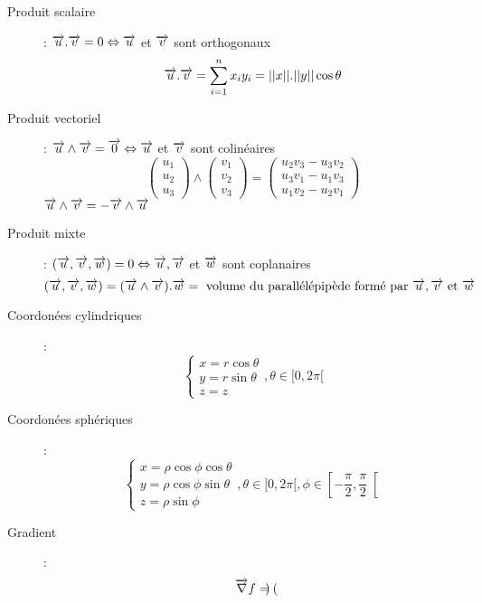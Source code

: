 \begin{description}
\item[Produit scalaire] : $\overrightarrow{u}.\overrightarrow{v}=0\Leftrightarrow\overrightarrow{u}$ et $\overrightarrow{v}$ sont orthogonaux
    \[
        \overrightarrow{u}.\overrightarrow{v}=\sum_{i=1}^nx_iy_i=||x||.||y||\cos\theta
    \]
\item[Produit vectoriel] : $\overrightarrow{u}\land\overrightarrow{v}=\overrightarrow{0}\Leftrightarrow\overrightarrow{u}$ et $\overrightarrow{v}$ sont colinéaires
    \[
        \begin{pmatrix}
            u_1\\
            u_2\\
            u_3
        \end{pmatrix}
        \land
        \begin{pmatrix}
            v_1\\
            v_2\\
            v_3
        \end{pmatrix}
        =
        \begin{pmatrix}
            u_2v_3-u_3v_2\\
            u_3v_1-u_1v_3\\
            u_1v_2-u_2v_1
        \end{pmatrix}
    \]
    $\overrightarrow{u}\land\overrightarrow{v}=-\overrightarrow{v}\land\overrightarrow{u}$
\item[Produit mixte] : $(\overrightarrow{u},\overrightarrow{v},\overrightarrow{w})=0\Leftrightarrow\overrightarrow{u},\overrightarrow{v}$ et $\overrightarrow{w}$ sont coplanaires
    \[
        (\overrightarrow{u},\overrightarrow{v},\overrightarrow{w})=(\overrightarrow{u}\land\overrightarrow{v}).\overrightarrow{w}=\textrm{ volume du parallélépipède formé par }\overrightarrow{u},\overrightarrow{v}\textrm{ et }\overrightarrow{w}
    \]
\item[Coordonées cylindriques] :
    \[
        \begin{cases}
            x=r\cos\theta\\
            y=r\sin\theta\\
            z=z
        \end{cases},
        \theta\in[0,2\pi[
    \]
\item[Coordonées sphériques] :
    \[
        \begin{cases}
            x=\rho\cos\phi\cos\theta\\
            y=\rho\cos\phi\sin\theta\\
            z=\rho\sin\phi
        \end{cases},
        \theta\in[0,2\pi[,
        \phi\in\left[-\frac{\pi}{2},\frac{\pi}{2}\right[
    \]
\item[Gradient] :
    \[
        \overrightarrow{\nabla} f=
        \begin{pmatrix}

\end{pmatrix}\]
\end{description}

